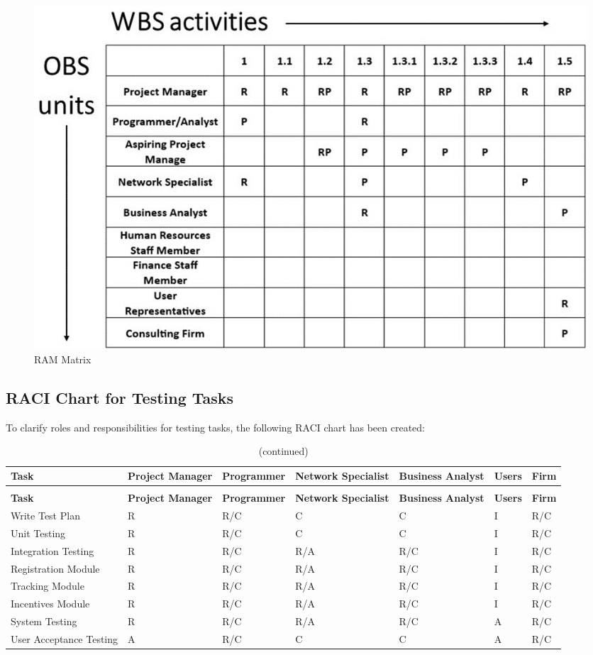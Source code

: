 \begin{figure}[ht]
    \includegraphics[width=\textwidth]{images/ram.png}
    \caption{RAM Matrix}
    \label{fig:ram}
\end{figure}

\subsection*{RACI Chart for Testing Tasks}

To clarify roles and responsibilities for testing tasks, the following RACI chart has been created:

\begin{longtable}{|p{3cm}|p{2cm}|p{2cm}|p{2cm}|p{2cm}|p{1cm}|p{1cm}|}
\caption{RACI Chart for Testing Tasks}
\label{tab:raci_testing} \\
\hline
\rowcolor{lightgray} \textbf{Task} & \textbf{Project Manager} & \textbf{Programmer} & \textbf{Network Specialist} & \textbf{Business Analyst} & \textbf{Users} & \textbf{Firm} \\
\hline
\endfirsthead
\caption[]{(continued)} \\
\hline
\rowcolor{lightgray} \textbf{Task} & \textbf{Project Manager} & \textbf{Programmer} & \textbf{Network Specialist} & \textbf{Business Analyst} & \textbf{Users} & \textbf{Firm} \\
\hline
\endhead
\hline
\endfoot
\hline
\endlastfoot
Write Test Plan & R & R/C & C & C & I & R/C \\
\hline
Unit Testing & R & R/C & C & C & I & R/C \\
\hline
Integration Testing & R & R/C & R/A & R/C & I & R/C \\
\hline
Registration Module & R & R/C & R/A & R/C & I & R/C \\
\hline
Tracking Module & R & R/C & R/A & R/C & I & R/C \\
\hline
Incentives Module & R & R/C & R/A & R/C & I & R/C \\
\hline
System Testing & R & R/C & R/A & R/C & A & R/C \\
\hline
User Acceptance Testing & A & R/C & C & C & A & R/C \\
\hline
\end{longtable}

